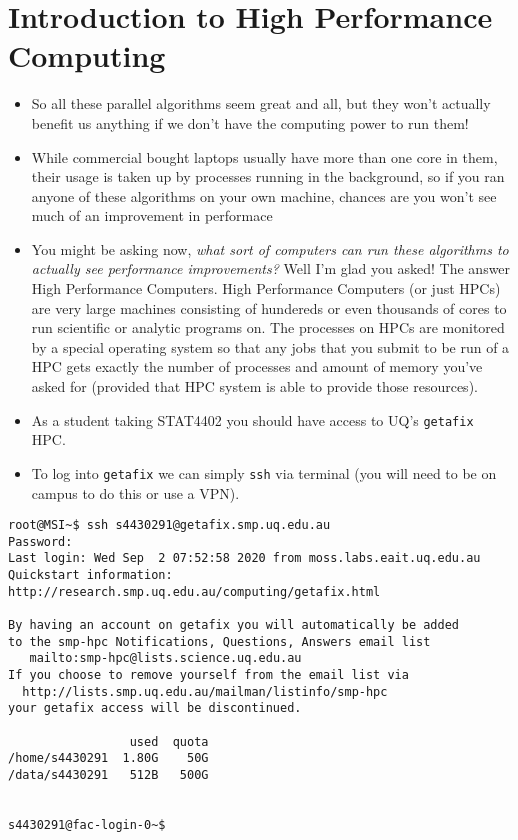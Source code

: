 \section{Introduction to High Performance Computing}

\begin{itemize}
    \item So all these parallel algorithms seem great and all, but they won't actually benefit us anything if we don't have the computing power to run them!
    \item While commercial bought laptops usually have more than one core in them, their usage is taken up by processes running in the background, so if you ran anyone of these algorithms on your own machine, chances are you won't see much of an improvement in performace
    \item You might be asking now, {\it what sort of computers can run these algorithms to actually see performance improvements?} Well I'm glad you asked! The answer {High Performance Computers}. High Performance Computers (or just HPCs) are very large machines consisting of hundereds or even thousands of cores to run scientific or analytic programs on. The processes on HPCs are monitored by a special operating system so that any jobs that you submit to be run of a HPC gets exactly the number of processes and amount of memory you've asked for (provided that HPC system is able to provide those resources).
    \item As a student taking STAT4402 you should have access to UQ's \texttt{getafix} HPC.
    \item To log into \texttt{getafix} we can simply \texttt{ssh} via terminal (you will need to be on campus to do this or use a VPN).
\end{itemize}
\begin{verbatim}
root@MSI~$ ssh s4430291@getafix.smp.uq.edu.au
Password:
Last login: Wed Sep  2 07:52:58 2020 from moss.labs.eait.uq.edu.au
Quickstart information: http://research.smp.uq.edu.au/computing/getafix.html

By having an account on getafix you will automatically be added
to the smp-hpc Notifications, Questions, Answers email list
   mailto:smp-hpc@lists.science.uq.edu.au
If you choose to remove yourself from the email list via
  http://lists.smp.uq.edu.au/mailman/listinfo/smp-hpc
your getafix access will be discontinued.

                 used  quota
/home/s4430291  1.80G    50G
/data/s4430291   512B   500G


s4430291@fac-login-0~$
\end{verbatim}

